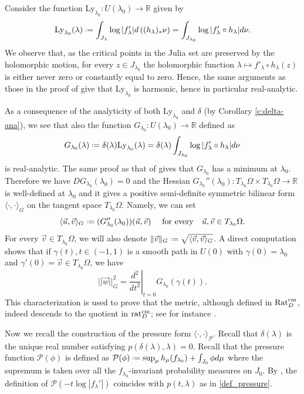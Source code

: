 \documentclass[11pt]{amsart}
\theoremstyle{plain}
\theoremstyle{definition}
\theoremstyle{remark}
\newcommand{\bbR}{\mathbb{R}} %
\newcommand*{\defeq}{\mathrel{\vcenter{\baselineskip0.5ex \lineskiplimit0pt
			\hbox{\scriptsize.}\hbox{\scriptsize.}}}%
	=}
\begin{document}
Consider the function 
$\mathrm{Ly}_{\lambda_0} \colon U(\lambda_0)\to \bbR$
given by
$$\mathrm{Ly}_{\lambda_0}(\lambda) \defeq  \int_{J_\lambda} \log|f'_\lambda| d\left((h_\lambda)_* \nu\right)=\int_{J_{\lambda_0}} \log|f'_\lambda \circ h_\lambda|d\nu.$$
We observe that, as the critical points 
in the Julia set
are
preserved by the holomorphic motion,
for every $z\in J_{\lambda_0}$
the holomorphic
function
$\lambda \mapsto f'_\lambda \circ h_\lambda (z)$
is either never zero or constantly equal to zero. Hence,
the same arguments as 
those in the proof of 
\cite[Lemma 4.2]{BH24} give that 
 $\mathrm{Ly}_{\lambda_0}$
is harmonic, hence 
in particular
real-analytic.


As a consequence of the analyticity of both $\mathrm{Ly}_{\lambda_0}$
and $\delta$ (by 
Corollary \ref{c:delta-ana}),
we see that also the function
 $G_{\lambda_0} \colon U(\lambda_0) \to \bbR$ defined as
$$G_{\lambda_0}(\lambda) \defeq \delta(\lambda)\mathrm{Ly}_{\lambda_0}(\lambda) = \delta(\lambda) \int_{J_{\lambda_0}} \log|f'_\lambda \circ h_\lambda|d\nu$$
is 
real-analytic. 
The same proof as
that of  \cite[Proposition 4.5]{BH24} gives that
$G_{\lambda_0}$ has a minimum at $\lambda_0$.
Therefore we have $DG_{\lambda_0}(\lambda_0)=0$ and the Hessian $G_{\lambda_0}''(\lambda_0) \colon T_{\lambda_0}\Omega \times T_{\lambda_0}\Omega \to \mathbb R$ is well-defined at $\lambda_0$
and it gives
a positive semi-definite symmetric bilinear form $\langle \cdot, \cdot \rangle_G$ on the tangent space $T_{\lambda_0}\Omega$. Namely,
we can set
$$\langle \vec{u},\vec{v} \rangle_G \defeq (G_{\lambda_0}''(\lambda_0))(\vec{u},\vec{v})
\quad
\mbox{ for every}
\quad
\vec{u},\vec{v} \in T_{\lambda_0}\Omega.$$
For every $\vec{v}
\in T_{\lambda_0}\Omega$,
we will also denote
$\|\vec{v}\|_G \defeq \sqrt{\langle \vec{v}, \vec{v}\rangle_G}$.
A direct computation shows that
if 
 $\gamma(t), t \in (-1, 1)$
 is a smooth
path in $U(0)$ with $\gamma(0) = \lambda_0$ and $\gamma'(0)=\vec{v} \in T_{\lambda_0}\Omega$, we have 
$$||\vec{w}||_G^2 = \left.\frac{d^2}{dt^2} \right|_{t=0} G_{\lambda_0}(\gamma(t)).$$
This characterization is used to prove that the metric, although defined in 
${\rm Rat}_D^{\rm cm}$,
indeed descends to the quotient in ${\rm rat}_D^{\rm cm}$; see for instance \cite[Section 4.2]{BH24}.

\bigskip

Now we recall the construction of the pressure form $\langle \cdot, \cdot \rangle_{\mathcal{P}}$. Recall that  $\delta(\lambda)$ is the unique real number 
satisfying $p(\delta(\lambda),\lambda) = 0.$ Recall that the pressure function $\mathcal{P}(\phi)$ is defined as $\mathcal{P}(\phi) \defeq \sup_{\mu} h_\mu(f_{\lambda_0}) + \int_{J_0}\phi d\mu$ where the supremum is taken over all the $f_{\lambda_0}$-invariant probability measures on $J_0$. By \cite{PRLS04}, the definition of $\mathcal{P}(-t\log|f_\lambda'|)$ coincides with $p(t,\lambda)$ as in \eqref{def_pressure}.
\end{document}
